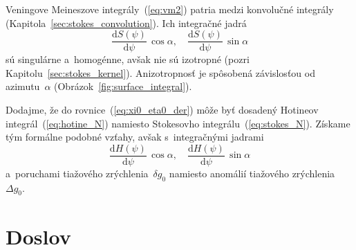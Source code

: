 \documentclass[a4paper, 12pt]{book}
\newcommand{\diff}{\mathrm d}
\begin{document}
Veningove Meineszove integrály~(\ref{eq:vm2}) patria medzi konvolučné integrály 
(Kapitola~\ref{sec:stokes_convolution}).  Ich integračné jadrá
%
\begin{equation}
\label{eq:vm_kernels}
\frac{\diff S(\psi)}{\diff\psi} \, \cos\alpha{,} \quad \frac{\diff 
S(\psi)}{\diff\psi} \, \sin\alpha
\end{equation}
%
sú singulárne a~homogénne, avšak nie sú izotropné (pozri 
Kapitolu~\ref{sec:stokes_kernel}).  Anizotropnosť je spôsobená závislosťou od 
azimutu~$\alpha$ (Obrázok~\ref{fig:surface_integral}).

Dodajme, že do rovnice~(\ref{eq:xi0_eta0_der}) môže byť dosadený Hotineov 
integrál~(\ref{eq:hotine_N}) namiesto Stokesovho integrálu~(\ref{eq:stokes_N}).  
Získame tým formálne podobné vzťahy, avšak s~integračnými jadrami
%
\begin{equation}
\label{eq:vm_kernels2}
\frac{\diff H(\psi)}{\diff\psi} \, \cos\alpha{,} \quad \frac{\diff 
H(\psi)}{\diff\psi} \, \sin\alpha
\end{equation}
%
a~poruchami tiažového zrýchlenia~$\delta g_0$ namiesto anomálií tiažového 
zrýchlenia~$\Delta g_0$.






\chapter*{Doslov}
\end{document}
